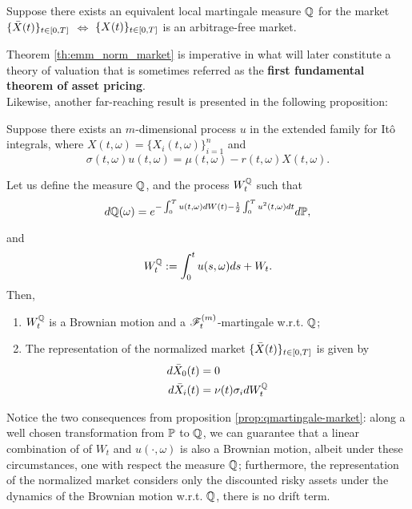 \documentclass[../TGMAFFIRO.tex]{subfiles}
\begin{document}
\begin{theorem}\label{th:emm_norm_market}
	Suppose there exists an equivalent local martingale measure $\mathbb{Q}$ for the market $\{\bar{X}(t)\}_{t\in[0,T]}$ $\iff$ $\{X(t)\}_{t\in[0,T]}$ is an arbitrage-free market.
\end{theorem}

Theorem \ref{th:emm_norm_market} is imperative in what will later constitute a theory of valuation that is sometimes referred as the \textbf{first fundamental theorem of asset pricing}.\\

Likewise, another far-reaching result is presented in the following proposition:

\begin{proposition}\label{prop:qmartingale-market}
	Suppose there exists an $m$-dimensional process $u$ in the extended family for It\^o integrals, where $X(t, \omega) = \{X_i(t,\omega)\}_{i=1}^n$ and
	\begin{equation}
		\sigma(t,\omega)u(t,\omega) = \mu(t, \omega) - r(t, \omega)X(t,\omega).
	\end{equation}

Let us define the measure $\mathbb{Q}$, and the process $W^{\mathbb{Q}}_t$ such that
\[
	d\mathbb{Q}(\omega) = e^{-\int_0^Tu(t,\omega) dW(t) - \frac{1}{2}\int_0^Tu^2(t,\omega) dt}d\mathbb{P},
\]

and
\[
	W^{\mathbb{Q}}_t := \int_0^tu(s,\omega) ds + W_t.
\]
Then,
\begin{enumerate}
	\item $W^{\mathbb{Q}}_t$ is a Brownian motion and a $\mathscr{F}_t^{(m)}$-martingale w.r.t. $\mathbb{Q}$;
	\item The representation of the normalized market $\{\bar{X}(t)\}_{t\in[0,T]}$ is given by
	\begin{align*}
		d\bar{X}_0(t) &= 0 \\
		d\bar{X}_i(t) &= \nu(t)\sigma_i dW^{\mathbb{Q}}_t
	\end{align*}
\end{enumerate}
\end{proposition}

Notice the two consequences from proposition \ref{prop:qmartingale-market}: along a well chosen transformation from $\mathbb{P}$ to $\mathbb{Q}$, we can guarantee that a linear combination of of $W_t$ and $u(\cdot, \omega)$ is also a Brownian motion, albeit under these circumstances, one with respect the measure $\mathbb{Q}$; furthermore, the representation of the normalized market considers only the discounted risky assets under the dynamics of the Brownian motion w.r.t. $\mathbb{Q}$, there is no drift term.
 
\end{document}
